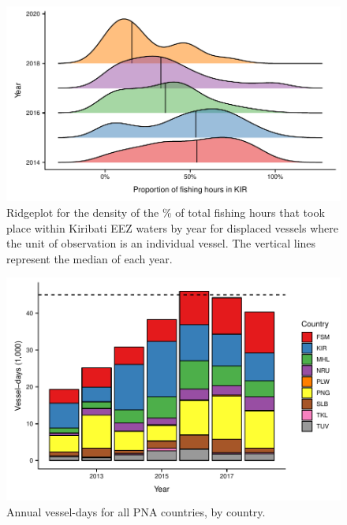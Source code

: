 \documentclass[12pt]{article}
\begin{document}
\begin{figure}
\centering
	\includegraphics{img/hist_kir_fishing.pdf}
	\caption{\label{fig:hist_kir_fishing}Ridgeplot for the density of the \% of total fishing hours that took place within Kiribati EEZ waters by year for displaced vessels where the unit of observation is an individual vessel. The vertical lines represent the median of each year.}	
\end{figure}

\begin{figure}
\centering
	\includegraphics{img/all_PS_VDS_cty_year.pdf}
	\caption{\label{fig:all_PS_VDS_cty_year}Annual vessel-days for all PNA countries, by country.}
\end{figure}
\end{document}
